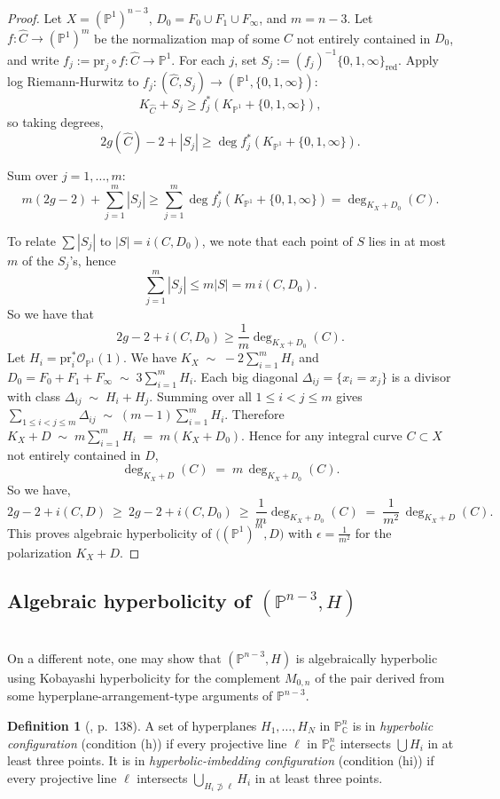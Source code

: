 \documentclass{amsart}
\theoremstyle{definition}
\newtheorem{definition}[theorem]{Definition}
\theoremstyle{remark}
\newcommand{\PP}{\mathbb{P}}
\begin{document}
\begin{proof}
Let $X = (\mathbb P^1)^{n-3}$, $D_0 = F_0\cup F_1\cup F_{\infty}$, and $m=n-3$. Let $f:\widehat C\to (\PP^1)^{m}$ be the normalization map of some $C$ not entirely contained in $D_0$, and write $f_j:=\mathrm{pr}_j\circ f:\widehat C\to\PP^1$.
For each $j$, set $S_j:=(f_j)^{-1}\{0,1,\infty\}_{\mathrm{red}}$. Apply log Riemann-Hurwitz to 
\( f_j : (\widehat{C}, S_j) \to (\PP^1, \{0,1,\infty\}) \):
\[
K_{\widehat{C}} + S_j \ge f_j^*(K_{\PP^1} + \{0,1,\infty\}),
\]
so taking degrees,
$$
2g(\widehat{C}) - 2 + |S_j| \ge \deg f_j^*(K_{\PP^1} + \{0,1,\infty\}).
$$

Sum over \( j = 1, \ldots, m \):
$$
m(2g - 2) + \sum_{j=1}^m |S_j|
\ge \sum_{j=1}^m \deg f_j^*(K_{\PP^1} + \{0,1,\infty\})
= \deg_{K_X + D_0}(C).
$$

To relate \( \sum |S_j| \) to \( |S| = i(C,D_0) \), we note that each point of \( S \) lies in at most \( m \) of the \( S_j \)'s, hence
\[
\sum_{j=1}^m |S_j| \le m |S| = m\, i(C,D_0).
\]
So we have that
$$
2g - 2 + i(C,D_0)\ge  \frac 1m\deg_{K_X + D_0}(C).
$$ 
Let $H_i=\mathrm{pr}_i^*\mathcal O_{\PP^1}(1)$.
We have
$
K_X \;\sim\; -2\sum_{i=1}^m H_i
$
and 
$
D_0 = F_0+F_1+F_\infty \;\sim\; 3\sum_{i=1}^m H_i.
$
Each big diagonal $\Delta_{ij}=\{x_i=x_j\}$ is a divisor with class
$
\Delta_{ij}\;\sim\; H_i+H_j.
$
Summing over all $1\le i<j\le m$ gives
$
\sum_{1\le i<j\le m}\Delta_{ij} \;\sim\; (m-1)\sum_{i=1}^m H_i.
$
Therefore
$
K_X+D\;\sim\; m\sum_{i=1}^m H_i
\;=\; m (K_X+D_0).
$
Hence for any integral curve $C\subset X$ not entirely contained in $D$,
\[
\deg_{K_X+D}(C) \;=\; m\,\deg_{K_X+D_0}(C).
\]
So we have,
\[
2g-2+i(C,D)\ \ge\ 2g-2+i(C,D_0)\ \ge\ \frac 1m\deg_{K_X+D_0}(C)
\;=\; \frac 1{m^2}\,\deg_{K_X+D}(C).
\]
This proves algebraic hyperbolicity of $\bigl((\PP^1)^m,D\bigr)$ with
$\epsilon=\frac1{m^2}$ for the polarization $K_X+D$.
\end{proof}



\subsection{Algebraic hyperbolicity of $(\mathbb P^{n-3},H)$}\mbox{}\\
On a different note, one may show that $(\mathbb{P}^{n-3}, H)$ is algebraically hyperbolic using Kobayashi hyperbolicity for the complement $M_{0,n}$ of the pair derived from some hyperplane-arrangement-type arguments of $\mathbb P^{n-3}$. 

\begin{definition}[\cite{Ko98}, p.~138]
A set of hyperplanes $H_1,\ldots,H_N$ in $\mathbb{P}^n_{\mathbb{C}}$ is in \emph{hyperbolic configuration} (condition (h)) if every projective line $\ell$ in $\mathbb{P}^n_{\mathbb{C}}$ intersects $\bigcup H_i$ in at least three points. It is in \emph{hyperbolic-imbedding configuration} (condition (hi)) if every projective line $\ell$ intersects $\bigcup_{H_i \not\supset \ell} H_i$ in at least three points.
\end{definition}
\end{document}
